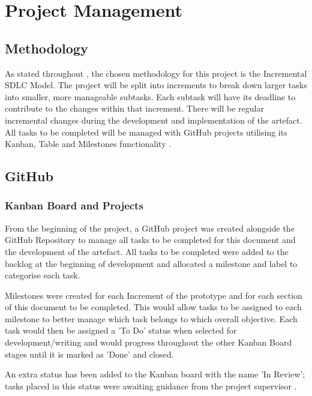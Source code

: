 \chapter{Project Management}
\label{chap:pm}

\section{Methodology}

As stated throughout , the chosen methodology for this project is the Incremental SDLC Model. The project will be split into increments to break down larger tasks into smaller, more manageable subtasks. Each subtask will have its deadline to contribute to the changes within that increment. There will be regular incremental changes during the development and implementation of the artefact. All tasks to be completed will be managed with GitHub projects utilising its Kanban, Table and Milestones functionality .

\section{GitHub}

\subsection{Kanban Board and Projects}
\label{pm:kanban}

From the beginning of the project, a GitHub project was created alongside the GitHub Repository to manage all tasks to be completed for this document and the development of the artefact. All tasks to be completed were added to the backlog at the beginning of development and allocated a milestone and label to categorise each task.

Milestones were created for each Increment of the prototype and for each section of this document to be completed. This would allow tasks to be assigned to each milestone to better manage which task belongs to which overall objective. Each task would then be assigned a 'To Do' status when selected for development/writing and would progress throughout the other Kanban Board stages until it is marked as 'Done' and closed.

An extra status has been added to the Kanban board with the name 'In Review'; tasks placed in this status were awaiting guidance from the project supervisor .

